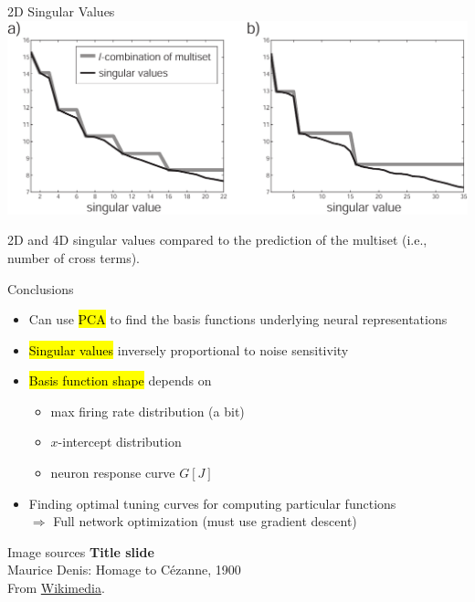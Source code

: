 \documentclass[handout,aspectratio=169]{beamer}
\begin{document}
  \begin{frame}{2D Singular Values}
		\centering
		\includegraphics[scale=.5]{media/c5.multiset.2D.pdf}

    2D and 4D singular values compared to the prediction of the multiset (i.e., number of cross terms).
	\end{frame}

	\begin{frame}{Conclusions}
		\begin{itemize}
			\setlength{\itemsep}{0.5cm}
			\item Can use \hl{PCA} to find the basis functions underlying neural representations
			\item \hl{Singular values} inversely proportional to noise sensitivity
			\item \hl{Basis function shape} depends on\\[0.25cm]
			\begin{itemize}
				\setlength{\itemsep}{0.25cm}
				\item max firing rate distribution (a bit)
        \item $x$-intercept distribution
				\item neuron response curve $G[J]$
			\end{itemize}
			\item Finding optimal tuning curves for computing particular functions\\
			$\Rightarrow$ Full network optimization (must use gradient descent)
		\end{itemize}
	\end{frame}

	\backupbegin

	\begin{frame}[noframenumbering]{Image sources}
		\small
		\textbf{Title slide}\\Maurice Denis: Homage to Cézanne, 1900\\From \href{https://commons.wikimedia.org/wiki/File:Maurice_Denis_Homage_to_Cezanne_1900.jpg}{Wikimedia}.
	\end{frame}

	\backupend
	
\end{document}
